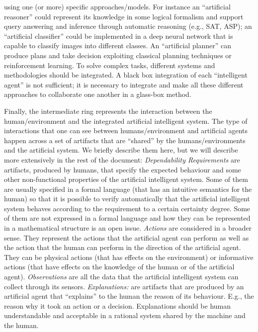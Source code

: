 using one (or more) specific approaches/models. For instance an
``artificial reasoner'' could represent its knowledge in some logical
formalism and support query answering and inference through automatic
reasoning (e.g., SAT, ASP); an ``artificial classifier'' could be
implemented in a deep neural network that is capable to classify
images into different classes. An ``artificial planner'' can produce
plans and take decision exploiting classical planning techniques or
reinforcement learning. To solve complex tasks, different systems and
methodologies should be integrated. A black box integration of each
``intelligent agent'' is not sufficient; it is necessary to integrate
and make all these different approaches to collaborate one another in
a glass-box method. 

Finally, the intermediate ring represents the interaction between the
human/environment and the integrated artificial intelligent system.
The type of interactions that one can see between humans/environment and
artificial agents happen across a set of artifacts that are
``shared'' by the humans/environments and the artificial system.
We briefly describe them here, but we will describe more extensively
in the rest of the document:
\emph{Dependability Requirements} are
artifacts, produced by humans, that specify the expected behaviour and
some other non-functional properties of the artificial intelligent
system. Some of them are usually specified in a formal language (that
has an intuitive semantics for the human) so that it is possible to
verify automatically that the artificial intelligent system behaves
according to the requirement to a certain certainty degree.  Some
of them are not expressed in a formal language and how they can be
represented in a mathematical structure is an open issue.
\emph{Actions} are considered in a broader sense. They
  represent the actions that the artificial agent can perform as well
  as the action that the human can perform in the direction of the
  artificial agent. They can be physical actions (that has effects on
  the environment) or informative actions (that have effects on the
  knowledge of the human or of the artificial agent). 
\emph{Observations} are all the data that the artificial
  intelligent system can collect through its sensors.
\emph{Explanations:} are artifacts that are produced by an artificial
  agent that ``explains'' to the human the reason of its
  behaviour. E.g., the reason why it took an action or a
  decision. Explanations should be human understandable and acceptable
  in a rational system shared by the machine and the human. 

